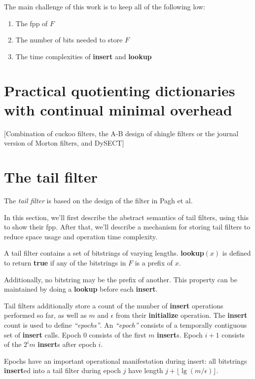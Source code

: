 \documentclass[letterpaper]{article}
\begin{document}
The main challenge of this work is to keep all of the following low:

\begin{enumerate}
\item The fpp of $F$
\item The number of bits needed to store $F$
\item The time complexities of {\bf insert} and {\bf lookup}
\end{enumerate}

\section{Practical quotienting dictionaries with continual minimal overhead}

[Combination of cuckoo filters, the A-B design of shingle filters or the journal version of Morton filters, and DySECT]

\section{The tail filter}

The {\em tail filter} is based on the design of the filter in Pagh et al.

In this section, we'll first describe the abstract semantics of tail filters, using this to show their fpp.
After that, we'll describe a mechanism for storing tail filters to reduce space usage and operation time complexity.

A tail filter contains a set of bitstrings of varying lengths. %
{\bf lookup$(x)$} is defined to return {\bf true} if any of the bitstrings in $F$ is a prefix of $x$.

Additionally, no bitstring may be the prefix of another.
This property can be maintained by doing a {\bf lookup} before each {\bf insert}.

Tail filters additionally store a count of the number of {\bf insert} operations performed so far, as well as $m$ and $\epsilon$ from their {\bf initialize} operation.
The {\bf insert} count is used to define {\em ``epochs''}.
An {\em ``epoch''} consists of a temporally contiguous set of {\bf insert} calls.
Epoch 0 consists of the first $m$ {\bf insert}s.
Epoch $i+1$ consists of the $2^i m$ {\bf insert}s after epoch $i$.

Epochs have an important operational manifestation during insert: all bitstrings {\bf insert}ed into a tail filter during epoch $j$ have length $j + \lfloor \lg (m / \epsilon) \rfloor$.
\end{document}
